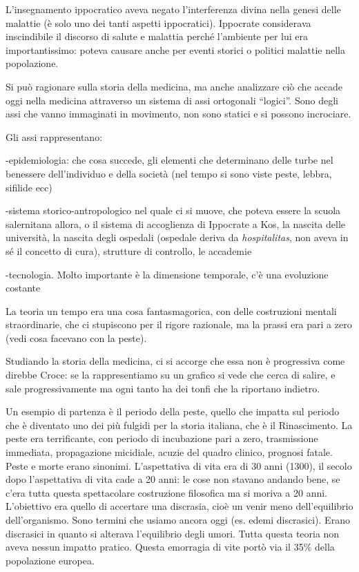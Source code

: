 \documentclass[]{article}
\begin{document}
L'insegnamento ippocratico aveva negato l'interferenza divina nella
genesi delle malattie (è solo uno dei tanti aspetti ippocratici).
Ippocrate considerava inscindibile il discorso di salute e malattia
perché l'ambiente per lui era importantissimo: poteva causare anche per
eventi storici o politici malattie nella popolazione.

Si può ragionare sulla storia della medicina, ma anche analizzare ciò
che accade oggi nella medicina attraverso un sistema di assi ortogonali
``logici''. Sono degli assi che vanno immaginati in movimento, non sono
statici e si possono incrociare.

Gli assi rappresentano:

-epidemiologia: che cosa succede, gli elementi che determinano delle
turbe nel benessere dell'individuo e della società (nel tempo si sono
viste peste, lebbra, sifilide ecc)

-sistema storico-antropologico nel quale ci si muove, che poteva essere
la scuola salernitana allora, o il sistema di accoglienza di Ippocrate a
Kos, la nascita delle università, la nascita degli ospedali (ospedale
deriva da \emph{hospitalitas}, non aveva in sé il concetto di cura),
strutture di controllo, le accademie

-tecnologia. Molto importante è la dimensione temporale, c'è una
evoluzione costante

La teoria un tempo era una cosa fantasmagorica, con delle costruzioni
mentali straordinarie, che ci stupiscono per il rigore razionale, ma la
prassi era pari a zero (vedi cosa facevano con la peste).

Studiando la storia della medicina, ci si accorge che essa non è
progressiva come direbbe Croce: se la rappresentiamo su un grafico si
vede che cerca di salire, e sale progressivamente ma ogni tanto ha dei
tonfi che la riportano indietro.

Un esempio di partenza è il periodo della peste, quello che impatta sul
periodo che è diventato uno dei più fulgidi per la storia italiana, che
è il Rinascimento. La peste era terrificante, con periodo di incubazione
pari a zero, trasmissione immediata, propagazione micidiale, acuzie del
quadro clinico, prognosi fatale. Peste e morte erano sinonimi.
L'aspettativa di vita era di 30 anni (1300), il secolo dopo
l'aspettativa di vita cade a 20 anni: le cose non stavano andando bene,
se c'era tutta questa spettacolare costruzione filosofica ma si moriva a
20 anni. L'obiettivo era quello di accertare una discrasia, cioè un
venir meno dell'equilibrio dell'organismo. Sono termini che usiamo
ancora oggi (es. edemi discrasici). Erano discrasici in quanto si
alterava l'equilibrio degli umori. Tutta questa teoria non aveva nessun
impatto pratico. Questa emorragia di vite portò via il 35\% della
popolazione europea.
\end{document}
